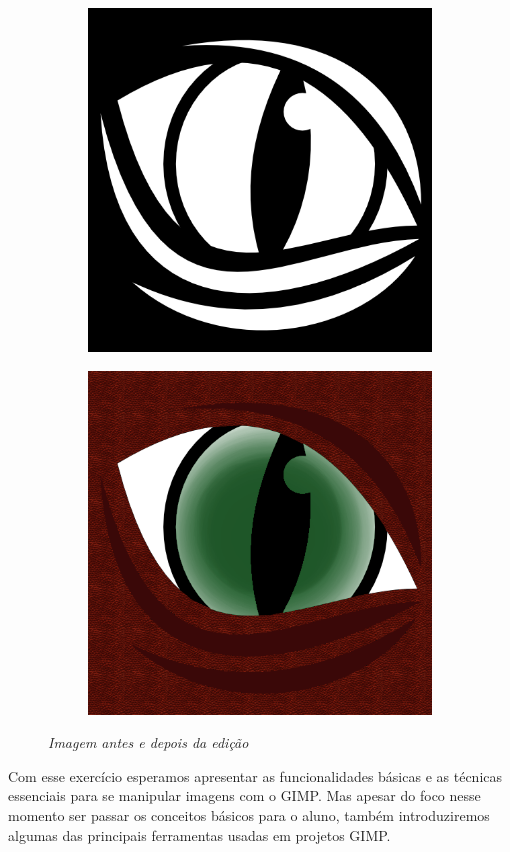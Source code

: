 \documentclass[12pt,onecolumn]{article}
\begin{document}
  \begin{figure}
  \centering
  \begin{subfigure}{.5\textwidth}
    \centering
    \includegraphics[width=.7\linewidth]{beast-eye.png}
    \label{fig:ex1_before}
  \end{subfigure}%
  \begin{subfigure}{.5\textwidth}
    \centering
    \includegraphics[width=.7\linewidth]{draft00.png}
    \label{fig:ex1_after}
  \end{subfigure}
  \caption{
    \footnotesize
    \it
    Imagem antes e depois da edição
  }
  \label{fig:intro}
  \end{figure}
  
  Com esse exercício esperamos apresentar as funcionalidades básicas e as
  técnicas essenciais para se manipular imagens com o GIMP. Mas apesar do foco
  nesse momento ser passar os conceitos básicos para o aluno, também
  introduziremos algumas das principais ferramentas usadas em projetos GIMP.
  
\end{document}
